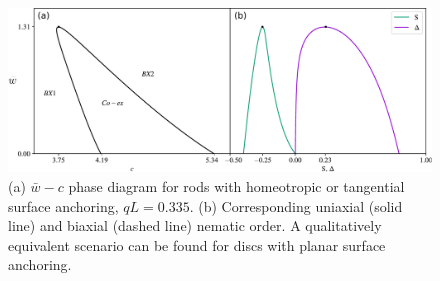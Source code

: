    \begin{figure}
	\includegraphics[width = \columnwidth]{figures/chapter-4/diagrams_q0.335_horizontal}
	\caption[$\bar{w} - c $ phase diagram for rods with homeotropic or tangential surface anchoring]{(a) $\bar{w} - c $ phase diagram for rods with homeotropic or tangential surface anchoring, $qL = 0.335$. (b) Corresponding uniaxial (solid line) and biaxial (dashed line) nematic order. A qualitatively equivalent scenario can be found for discs with planar surface anchoring.}
	\label{phdiag}
\end{figure}

%
%
%



